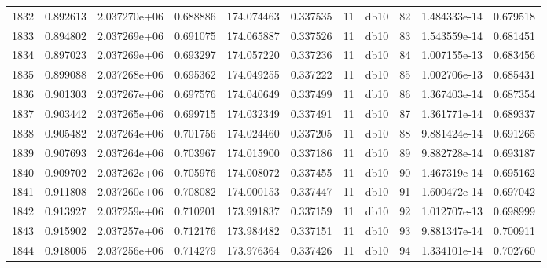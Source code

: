 \begin{tabular}{lrrrrrrlrrr}
1832 &    0.892613 &        2.037270e+06 &  0.688886 &              174.074463 &    0.337535 &      11 &         db10 &     82 &   1.484333e-14 &      0.679518 \\
1833 &    0.894802 &        2.037269e+06 &  0.691075 &              174.065887 &    0.337526 &      11 &         db10 &     83 &   1.543559e-14 &      0.681451 \\
1834 &    0.897023 &        2.037269e+06 &  0.693297 &              174.057220 &    0.337236 &      11 &         db10 &     84 &   1.007155e-13 &      0.683456 \\
1835 &    0.899088 &        2.037268e+06 &  0.695362 &              174.049255 &    0.337222 &      11 &         db10 &     85 &   1.002706e-13 &      0.685431 \\
1836 &    0.901303 &        2.037267e+06 &  0.697576 &              174.040649 &    0.337499 &      11 &         db10 &     86 &   1.367403e-14 &      0.687354 \\
1837 &    0.903442 &        2.037265e+06 &  0.699715 &              174.032349 &    0.337491 &      11 &         db10 &     87 &   1.361771e-14 &      0.689337 \\
1838 &    0.905482 &        2.037264e+06 &  0.701756 &              174.024460 &    0.337205 &      11 &         db10 &     88 &   9.881424e-14 &      0.691265 \\
1839 &    0.907693 &        2.037264e+06 &  0.703967 &              174.015900 &    0.337186 &      11 &         db10 &     89 &   9.882728e-14 &      0.693187 \\
1840 &    0.909702 &        2.037262e+06 &  0.705976 &              174.008072 &    0.337455 &      11 &         db10 &     90 &   1.467319e-14 &      0.695162 \\
1841 &    0.911808 &        2.037260e+06 &  0.708082 &              174.000153 &    0.337447 &      11 &         db10 &     91 &   1.600472e-14 &      0.697042 \\
1842 &    0.913927 &        2.037259e+06 &  0.710201 &              173.991837 &    0.337159 &      11 &         db10 &     92 &   1.012707e-13 &      0.698999 \\
1843 &    0.915902 &        2.037257e+06 &  0.712176 &              173.984482 &    0.337151 &      11 &         db10 &     93 &   9.881347e-14 &      0.700911 \\
1844 &    0.918005 &        2.037256e+06 &  0.714279 &              173.976364 &    0.337426 &      11 &         db10 &     94 &   1.334101e-14 &      0.702760 \\

\end{tabular}
